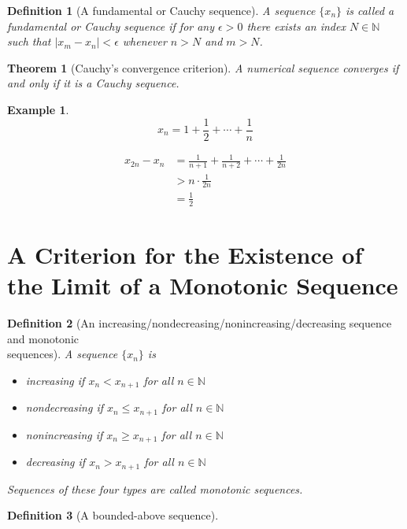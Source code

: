 \documentclass[onecolumn]{ctexart}
\newtheorem{definition}{Definition}
\newtheorem{theorem}{Theorem}
\newtheorem{example}{Example}
\begin{document}
\begin{definition}[A fundamental or Cauchy sequence]
  A sequence $\lbrace x_n \rbrace$ is called a fundamental or Cauchy sequence if 
  for any $\epsilon > 0$ there exists an index $N \in \mathbb{N}$ such that 
  $|x_m - x_n| < \epsilon$ whenever $n > N$ and $m > N$.
\end{definition}

\begin{theorem}[Cauchy's convergence criterion]
  A numerical sequence converges if and only if it is a Cauchy sequence.
\end{theorem}

\begin{example}
  \[
    x_n = 1 + \frac{1}{2} + \cdots + \frac{1}{n}
  \]

  \[
    \begin{split}
      x_{2n} - x_{n} &= \frac{1}{n+1} + \frac{1}{n+2} + \cdots + \frac{1}{2n} \\
                     &> n \cdot \frac{1}{2n} \\
                     &= \frac{1}{2}
    \end{split}
  \]
\end{example}

\section{A Criterion for the Existence of the Limit of a Monotonic Sequence}

\begin{definition}[An increasing/nondecreasing/nonincreasing/decreasing sequence and monotonic \\ sequences]
  A sequence $\lbrace x_n \rbrace$ is
  \begin{itemize}
    \item increasing if $x_n < x_{n+1}$ for all $n \in \mathbb{N}$
    \item nondecreasing if $x_n \leq x_{n+1}$ for all $n \in \mathbb{N}$
    \item nonincreasing if $x_n \geq x_{n+1}$ for all $n \in \mathbb{N}$
    \item decreasing if $x_n > x_{n+1}$ for all $n \in \mathbb{N}$
  \end{itemize}

  Sequences of these four types are called monotonic sequences.
\end{definition}

\begin{definition}[A bounded-above sequence]
  
\end{definition}
\end{document}
